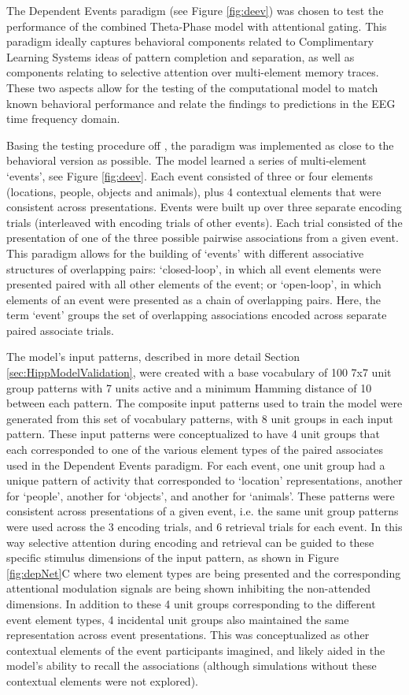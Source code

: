 \documentclass[11pt, titlepage, twoside]{article}
\begin{document}
The Dependent Events paradigm (see Figure \ref{fig:deev}) was chosen to test the performance of the combined Theta-Phase model with attentional gating.  This paradigm ideally captures behavioral components related to Complimentary Learning Systems ideas of pattern completion and separation, as well as components relating to selective attention over multi-element memory traces.  These two aspects allow for the testing of the computational model to match known behavioral performance and relate the findings to predictions in the EEG time frequency domain.

Basing the testing procedure off \textcite{HornerBisbyBushEtAl15}, the paradigm was implemented as close to the behavioral version as possible.  The model learned a series of multi-element `events', see Figure \ref{fig:deev}. Each event consisted of three or four elements (locations, people, objects and animals), plus 4 contextual elements that were consistent across presentations. Events were built up over three separate encoding trials (interleaved with encoding trials of other events). Each trial consisted of the presentation of one of the three possible pairwise associations from a given event. This paradigm allows for the building of `events' with different associative structures of overlapping pairs: `closed-loop', in which all event elements were presented paired with all other elements of the event; or `open-loop', in which elements of an event were presented as a chain of overlapping pairs. Here, the term `event' groups  the set of overlapping associations encoded across separate paired associate trials. 


The model's input patterns, described in more detail Section \ref{sec:HippModelValidation}, were created with a base vocabulary of 100 7x7 unit group patterns with 7 units active and a minimum Hamming distance of 10 between each pattern.  The composite input patterns used to train the model were generated from this set of vocabulary patterns, with 8 unit groups in each input pattern.  These input patterns were conceptualized to have 4 unit groups that each corresponded to one of the various element types of the paired associates used in the Dependent Events paradigm.  For each event, one unit group had a unique pattern of activity that corresponded to `location' representations, another for `people', another for `objects', and another for `animals'.  These patterns were consistent across presentations of a given event, i.e. the same unit group patterns were used across the 3 encoding trials, and 6 retrieval trials for each event. In this way selective attention during encoding and retrieval can be  guided to these specific stimulus dimensions of the input pattern, as shown in Figure \ref{fig:depNet}C where two element types are being presented and the corresponding attentional modulation signals are being shown inhibiting the non-attended dimensions.  In addition to these 4 unit groups corresponding to the different event element types, 4 incidental unit groups also maintained the same representation across event presentations.  This was conceptualized as other contextual elements of the event participants imagined, and likely aided in the model's ability to recall the associations (although simulations without these contextual elements were not explored). 
\end{document}
